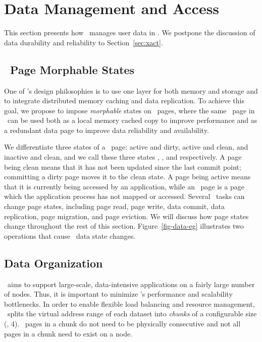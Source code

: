 \section{Data Management and Access}
\label{sec:data}

This section presents how \hotpot\ manages user data in \dsnvm. 
We postpone the discussion of data durability and reliability to Section~\ref{sec:xact}.

\subsection{\nvm\ Page Morphable States}
One of \hotpot's design philosophies is to use one layer for both memory and storage 
and to integrate distributed memory caching and data replication.
To achieve this goal, we propose to impose {\em morphable} states on \nvm\ pages,
where the same \nvm\ page in \hotpot\ can be used both as a local memory cached copy to improve performance
and as a redundant data page to improve data reliability and availability.

We differentiate three states of a \nvm\ page:
active and dirty, active and clean, and inactive and clean,
and we call these three states {\em \dirty}, {\em \committed}, and {\em \redundant} respectively.
A page being clean means that it has not been updated since the last commit point;
committing a dirty page moves it to the clean state.
A page being active means that it is currently being accessed by an application,
while an \redundant\ page is a page which the application process has not mapped or accessed.
Several \hotpot\ tasks can change page states,
including page read, page write, data commit, data replication, page migration, and page eviction.
We will discuss how page states change throughout the rest of this section.
Figure~\ref{fig-data-eg} illustrates two operations that cause \hotpot\ data state changes.

\subsection{Data Organization}
\hotpot\ aims to support large-scale, data-intensive applications
on a fairly large number of nodes. %
Thus, it is important to minimize \hotpot's performance and scalability bottlenecks.
In order to enable flexible load balancing and resource management,
\hotpot\ splits the virtual address range of each dataset 
into {\em chunks} of a configurable size (\eg, 4\MB).
\nvm\ pages in a chunk do not need to be physically consecutive
and not all pages in a chunk need to exist on a node.

